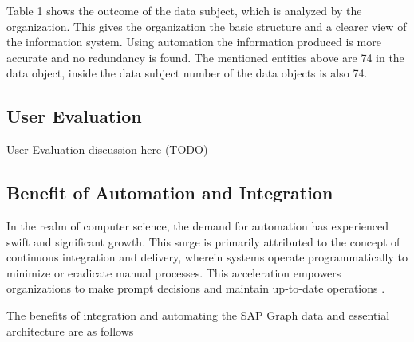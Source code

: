 \documentclass{article}
\begin{document}
Table 1 shows the outcome of the data subject, which is analyzed by the organization. This gives the organization the basic structure and a clearer view of the information system. Using automation the information produced is more accurate and no redundancy is found. The mentioned entities above are 74 in the data object, inside the data subject number of the data objects is also 74. 

\maketitle
\subsection{User Evaluation}
User Evaluation discussion here (TODO)

\maketitle
\subsection{Benefit of Automation and Integration}

In the realm of computer science, the demand for automation has experienced swift and significant growth. This surge is primarily attributed to the concept of continuous integration and delivery, wherein systems operate programmatically to minimize or eradicate manual processes. This acceleration empowers organizations to make prompt decisions and maintain up-to-date operations \parencite{wilcox2015}. 

The benefits of integration and automating the SAP Graph data and essential architecture are as follows
\end{document}
